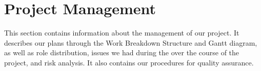 \section{Project Management}
This section contains information about the management of our project. It describes our plans through the Work Breakdown Structure and Gantt diagram, as well as role distribution, issues we had during the over the course of the project, and risk analysis. It also contains our procedures for quality assurance.

